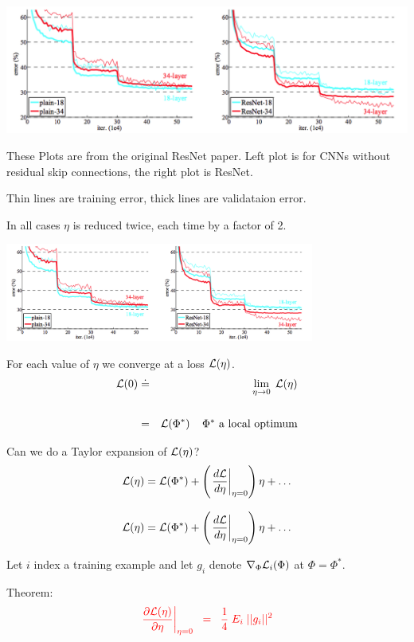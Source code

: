 {

\centerline{\includegraphics[width = 7in]{../images/annealing}}

\vfill
These Plots are from the original ResNet paper.  Left plot is for CNNs without residual skip connections, the right plot is ResNet.

\vfill
Thin lines are training error, thick lines are validataion error.

\vfill
In all cases $\eta$ is reduced twice, each time by a factor of 2.


\centerline{\includegraphics[width = 4in]{../images/annealing}}
For each value of $\eta$ we converge at a loss ${\cal L}(\eta)$.
\begin{eqnarray*}
{\cal L}(0) & \doteq & \lim_{\eta \rightarrow 0}\;{\cal L}(\eta) \\
\\
& = & {\cal L}(\Phi^*)\;\;\;\;\mbox{$\Phi^*$ a local optimum}
\end{eqnarray*}

\vfill
Can we do a Taylor expansion of ${\cal L}(\eta)$?
$${\cal L}(\eta) = {\cal L}(\Phi^*) + \left(\left.\frac{d{\cal L}}{d \eta}\right|_{\eta = 0}\right)\eta + \ldots$$

$${\cal L}(\eta) = {\cal L}(\Phi^*) + \left(\left.\frac{d{\cal L}}{d \eta}\right|_{\eta = 0}\right)\eta + \ldots$$

\vfill
Let $i$ index a training example and let $g_i$ denote $\nabla_\Phi {\cal L}_i(\Phi)$ at $\Phi = \Phi^*$.

\vfill
Theorem:
$${\color{red} \left.\frac{\partial {\cal L}(\eta)}{\partial \eta}\right|_{\eta = 0} \;\;=\;\; \frac{1}{4}\; E_i\; ||g_i||^2}$$

}
